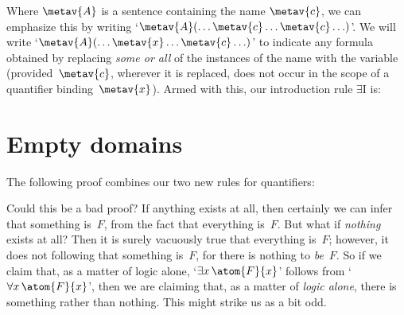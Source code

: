 Where $\metav{A}$ is a sentence containing the name $\metav{c}$, we
can emphasize this by writing `$\metav{A}(\ldots \metav{c} \ldots
\metav{c}\ldots)$'. We will write `$\metav{A}(\ldots \metav{x} \ldots
\metav{c}\ldots)$' to indicate any formula obtained by replacing
\emph{some or all} of the instances of the name  with the
variable~ (provided~$\metav{c}$, wherever it is
replaced, does not occur in the scope of a quantifier
binding~$\metav{x}$). Armed with this, our introduction rule
$\exists$I is:

\section{Empty domains}
The following proof combines our two new rules for quantifiers:
	\begin{fitchproof}
		\PR
	\end{fitchproof}
Could this be a bad proof? If anything exists at all, then certainly we can infer that something is~$F$, from the fact that everything is~$F$. But what if \emph{nothing} exists at all? Then it is surely vacuously true that everything is~$F$; however, it does not following that something is~$F$, for there is nothing to \emph{be}~$F$. So if we claim that, as a matter of logic alone, `$\exists x\,\atom{F}{x}$' follows from `$\forall x\,\atom{F}{x}$', then we are claiming that, as a matter of \emph{logic alone}, there is something rather than nothing. This might strike us as a bit odd.

